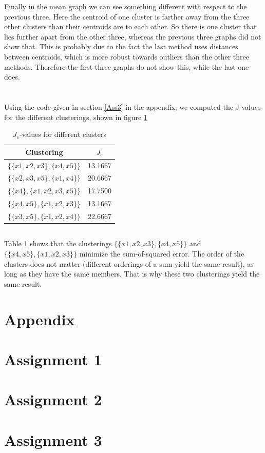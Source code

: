 \documentclass[10pt]{article}
\begin{document}
Finally in the mean graph we can see something different with respect to the previous three. Here the centroid of one cluster is farther away from the three other clusters than their centroids are to each other. So there is one cluster that lies further apart from the other three, whereas the previous three graphs did not show that. This is probably due to the fact the last method uses distances between centroids, which is more robust towards outliers than the other three methods. Therefore the first three graphs do not show this, while the last one does.

\section{}
\subsection{}
Using the code given in section \ref{Ass3} in the appendix, we computed the J-values for the different clusterings, shown in figure \ref{tab1}
\begin{table}[H]
	\centering
	\caption{$J_e$-values for different clusters}
	\label{tab1}
	\begin{tabular}{c|c}
		Clustering & $J_e$ \\
		\hline
		$\{\{x1, x2, x3\}, \{x4, x5\}\}$ & 13.1667\\
		$\{\{x2, x3, x5\}, \{x1, x4\}\}$ & 20.6667\\
		$\{\{x4\}, \{x1, x2, x3, x5\}\}$ & 17.7500\\
		$\{\{x4, x5\}, \{x1, x2, x3\}\}$ & 13.1667\\
		$\{\{x3, x5\}, \{x1, x2, x4\}\}$ & 22.6667
	\end{tabular}
\end{table}

\subsection{}
Table \ref{tab1} shows that the clusterings $\{\{x1, x2, x3\}, \{x4, x5\}\}$ and $\{\{x4, x5\}, \{x1, x2, x3\}\}$ minimize the sum-of-squared error. The order of the clusters does not matter (different orderings of a sum yield the same result), as long as they have the same members. That is why these two clusterings yield the same result. 

\newpage
\section*{Appendix}
\appendix
\section{Assignment 1}
{\label{Minkowski}}
\section{Assignment 2}
{\label{Ass2}}
\section{Assignment 3}
{\label{Ass3}}
\end{document}
